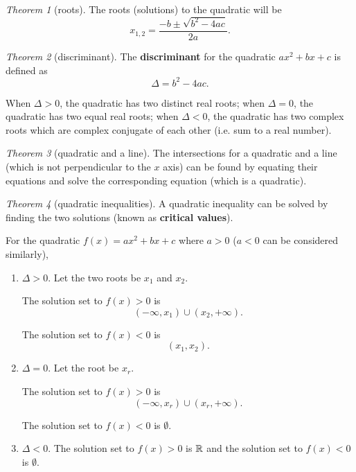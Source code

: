 \documentclass[8pt]{article}
\theoremstyle{remark}
\newtheorem{theorem}{Theorem}[section]
\begin{document}
        \begin{theorem}[roots]
            The roots (solutions) to the quadratic will be
            $$
                x_{1, 2} = \frac{-b \pm \sqrt{b^2 - 4ac}}{2a}.
            $$
        \end{theorem}

        \begin{theorem}[discriminant]
            The \textbf{discriminant} for the quadratic $ax^2 + bx + c$ is defined as
            $$
                \Delta = b^2 - 4ac.
            $$

            When $\Delta > 0$, the quadratic has two distinct real roots; when $\Delta = 0$, the quadratic has two equal real roots; when $\Delta < 0$, the quadratic has two complex roots which are complex conjugate of each other (i.e. sum to a real number).
        \end{theorem}

        \begin{theorem}[quadratic and a line]
            The intersections for a quadratic and a line (which is not perpendicular to the $x$ axis) can be found by equating their equations and solve the corresponding equation (which is a quadratic).
        \end{theorem}

        \begin{theorem}[quadratic inequalities]
            A quadratic inequality can be solved by finding the two solutions (known as \textbf{critical values}).

            For the quadratic $f(x) = ax^2 + bx + c$ where $a > 0$ ($a < 0$ can be considered similarly),
            \begin{enumerate}
                \item $\Delta > 0$. Let the two roots be $x_1$ and $x_2$.
                
                The solution set to $f(x) > 0$ is
                $$
                    (-\infty, x_1) \cup (x_2, +\infty).
                $$

                The solution set to $f(x) < 0$ is
                $$
                    (x_1, x_2).
                $$

                \item $\Delta = 0$. Let the root be $x_r$.
                
                The solution set to $f(x) > 0$ is
                $$
                    (-\infty, x_r) \cup (x_r, +\infty).
                $$

                The solution set to $f(x) < 0$ is $\emptyset$.

                \item $\Delta < 0$. The solution set to $f(x) > 0$ is $\mathbb{R}$ and the solution set to $f(x) < 0$ is $\emptyset$.
            \end{enumerate}
        \end{theorem}
\end{document}

